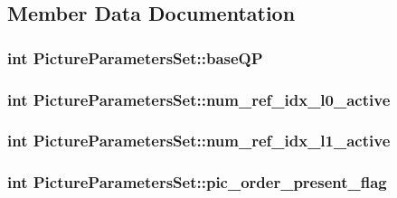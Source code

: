 \subsection{Member Data Documentation}
\hypertarget{struct_picture_parameters_set_a1c6a508d31929ad84dec0b717ac484a4}{
\subsubsection[{baseQP}]{\setlength{\rightskip}{0pt plus 5cm}int {\bf PictureParametersSet::baseQP}}}
\label{struct_picture_parameters_set_a1c6a508d31929ad84dec0b717ac484a4}
\hypertarget{struct_picture_parameters_set_abc9eb8dcb637bef8a76a7c12380fccf9}{
\subsubsection[{num\_\-ref\_\-idx\_\-l0\_\-active}]{\setlength{\rightskip}{0pt plus 5cm}int {\bf PictureParametersSet::num\_\-ref\_\-idx\_\-l0\_\-active}}}
\label{struct_picture_parameters_set_abc9eb8dcb637bef8a76a7c12380fccf9}
\hypertarget{struct_picture_parameters_set_afb1dc1e024b6c9263e33d3f1dd233203}{
\subsubsection[{num\_\-ref\_\-idx\_\-l1\_\-active}]{\setlength{\rightskip}{0pt plus 5cm}int {\bf PictureParametersSet::num\_\-ref\_\-idx\_\-l1\_\-active}}}
\label{struct_picture_parameters_set_afb1dc1e024b6c9263e33d3f1dd233203}
\hypertarget{struct_picture_parameters_set_a9611d788502cf2646a1fafd8f1cc7e4f}{
\subsubsection[{pic\_\-order\_\-present\_\-flag}]{\setlength{\rightskip}{0pt plus 5cm}int {\bf PictureParametersSet::pic\_\-order\_\-present\_\-flag}}}
